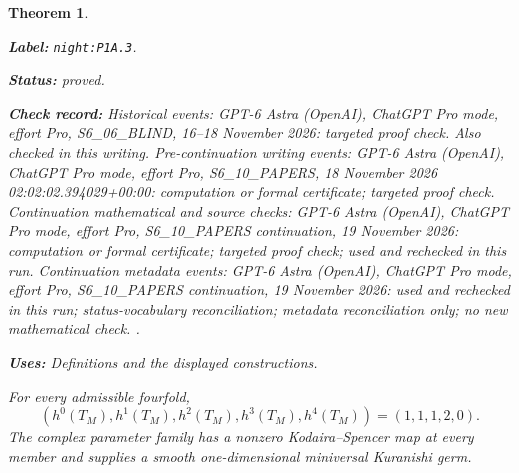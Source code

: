 \documentclass[11pt,a4paper]{article}
\newtheorem{theorem}{Theorem}[section]
\theoremstyle{definition}
\newcommand{\StatementRecord}[4]{\par\smallskip\begingroup\upshape\raggedright\noindent\textbf{Label:} \nolinkurl{#1}.\par\noindent\textbf{Status:} #2.\par\noindent\textbf{Check record:} #3.\par\noindent\textbf{Uses:} #4.\par\endgroup\smallskip}
\begin{document}
\begin{theorem}\label{night:P1A.3}
\StatementRecord{night:P1A.3}{proved}{Historical events: GPT-6 Astra (OpenAI), ChatGPT Pro mode, effort Pro, S6\_06\_BLIND, 16--18 November 2026: targeted proof check. Also checked in this writing. Pre-continuation writing events: GPT-6 Astra (OpenAI), ChatGPT Pro mode, effort Pro, S6\_10\_PAPERS, 18 November 2026 02:02:02.394029+00:00: computation or formal certificate; targeted proof check. Continuation mathematical and source checks: GPT-6 Astra (OpenAI), ChatGPT Pro mode, effort Pro, S6\_10\_PAPERS continuation, 19 November 2026: computation or formal certificate; targeted proof check; used and rechecked in this run. Continuation metadata events: GPT-6 Astra (OpenAI), ChatGPT Pro mode, effort Pro, S6\_10\_PAPERS continuation, 19 November 2026: used and rechecked in this run; status-vocabulary reconciliation; metadata reconciliation only; no new mathematical check. }{Definitions and the displayed constructions}
For every admissible fourfold,
\[
 (h^0(T_M),h^1(T_M),h^2(T_M),h^3(T_M),h^4(T_M))
 =(1,1,1,2,0).
\]
The complex parameter family has a nonzero Kodaira--Spencer map
at every member and supplies a smooth one-dimensional miniversal
Kuranishi germ.
\end{theorem}
\end{document}
